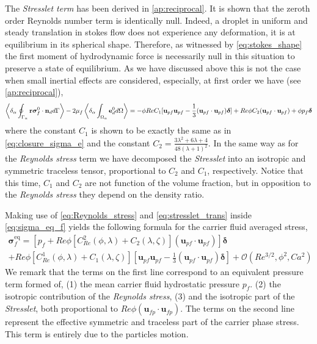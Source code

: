 The \textit{Stresslet term} has been derived in \ref{ap:reciprocal}. 
It is shown that the zeroth order Reynolds number term is identically null. 
Indeed, a droplet in uniform and steady translation in stokes flow does not experience any deformation, it is at equilibrium in its spherical shape.
Therefore, as witnessed by \ref{eq:stokes_shape} the first moment of hydrodynamic force is necessarily null in this situation to preserve a state of equilibrium. 
As we have discussed above this is not the case when small inertial effects are considered, especially, at first order we have (see \ref{ap:reciprocal}),
\begin{equation*}
    \left<\delta_\alpha \oint_{\Gamma_{\alpha}} \textbf{r}\bm{\sigma}_f^0 \cdot \textbf{n}_d d\Gamma\right>
    - 2 \mu_f \left<\delta_\alpha \int_{\Omega_{\alpha}} \textbf{e}_d^0 d\Omega\right>
    =
    - \phi Re C_1
    [
        \textbf{u}_{pf}\textbf{u}_{pf} - \frac{1}{3}(\textbf{u}_{pf}\cdot \textbf{u}_{pf})\bm\delta 
    ]
    + Re \phi C_2 (\textbf{u}_{pf}\cdot \textbf{u}_{pf}) 
    + \phi p_f \bm\delta
    \label{eq:stresslet_trans}
\end{equation*} 
where the constant $C_1$ is shown to be exactly the same as in \ref{eq:closure_sigma_e} and the constant $C_2 =\frac{3\lambda^2 + 6\lambda + 4}{48(\lambda +1 )^2}$. 
In the same way as for the \textit{Reynolds stress} term we have decomposed the \textit{Stresslet} into an isotropic and symmetric traceless tensor, proportional to $C_2$ and $C_1$, respectively. 
Notice that this time, $C_1$ and $C_2$ are not function of the volume fraction, but in opposition to the \textit{Reynolds stress} they depend on the density ratio. 

Making use of \ref{eq:Reynolds_stress} and \ref{eq:stresslet_trans} inside \ref{eq:sigma_eq_f} yields the following formula for the carrier fluid averaged stress, 
\begin{multline*}
    \bm{\sigma}^\text{eq}_f = 
    \left[ p_f + Re \phi  [C_{Re}^2(\phi,\lambda) + C_2(\lambda,\zeta)](\textbf{u}_{pf}\cdot \textbf{u}_{pf}) \right]\bm\delta \\
    + Re \phi [C_{Re}^1(\phi,\lambda) + C_1(\lambda,\zeta)]\left[
            \textbf{u}_{pf}\textbf{u}_{pf}
            - \frac{1}{3}(\textbf{u}_{pf}\cdot \textbf{u}_{pf})\bm\delta
    \right]
    + \mathcal{O}(Re^{3/2},\phi^2, Ca^2 )
\end{multline*} 
We remark that the terms on the first line correspond to an equivalent pressure term formed of, 
(1) the mean carrier fluid hydrostatic pressure $p_f$. 
(2) the isotropic contribution of the \textit{Reynolds stress}, 
(3) and the isotropic part of the \textit{Stresslet}, both proportional to $Re \phi (\textbf{u}_{fp}\cdot \textbf{u}_{fp})$.  
The terms on the second line represent the effective symmetric and traceless part of the carrier phase stress. 
This term is entirely due to the particles motion. 



